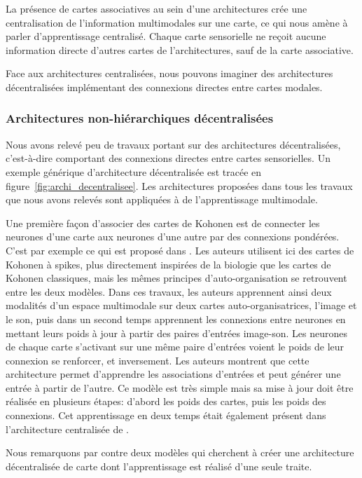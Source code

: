\documentclass[../main]{subfiles}
\begin{document}
La présence de cartes associatives au sein d'une architectures crée une centralisation de l'information multimodales sur une carte, ce qui nous amène à parler d'apprentissage centralisé. Chaque carte sensorielle ne reçoit aucune information directe d'autres cartes de l'architectures, sauf de la carte associative.

Face aux architectures centralisées, nous pouvons imaginer des architectures décentralisées implémentant des connexions directes entre cartes modales.

\subsubsection{Architectures non-hiérarchiques décentralisées}

Nous avons relevé peu de travaux portant sur des architectures décentralisées, c'est-à-dire comportant des connexions directes entre cartes sensorielles. Un exemple générique d'architecture décentralisée est tracée en figure~\ref{fig:archi_decentralisee}. Les architectures proposées dans tous les travaux que nous avons relevés sont appliquées à de l'apprentissage multimodale.

Une première façon d'associer des cartes de Kohonen est de connecter les neurones d'une carte aux neurones d'une autre par des connexions pondérées. C'est par exemple ce qui est proposé dans \cite{khacef_brain-inspired_2020}. Les auteurs utilisent ici des cartes de Kohonen à spikes, plus directement inspirées de la biologie que les cartes de Kohonen classiques, mais les mêmes principes d'auto-organisation se retrouvent entre les deux modèles. Dans ces travaux, les auteurs apprennent ainsi deux modalités d'un espace multimodale sur deux cartes auto-organisatrices, l'image et le son, puis dans un second temps apprennent les connexions entre neurones en mettant leurs poids à jour à partir des paires d'entrées image-son. Les neurones de chaque carte s'activant sur une même paire d'entrées voient le poids de leur connexion se renforcer, et inversement.
Les auteurs montrent que cette architecture permet d'apprendre les associations d'entrées et peut générer une entrée à partir de l'autre. 
Ce modèle est très simple mais sa mise à jour doit être réalisée en plusieurs étapes: d'abord les poids des cartes, puis les poids des connexions. Cet apprentissage en deux temps était également présent dans l'architecture centralisée de \cite{dominey13}.

Nous remarquons par contre deux modèles qui cherchent à créer une architecture décentralisée de carte dont l'apprentissage est réalisé d'une seule traite. 
\end{document}
